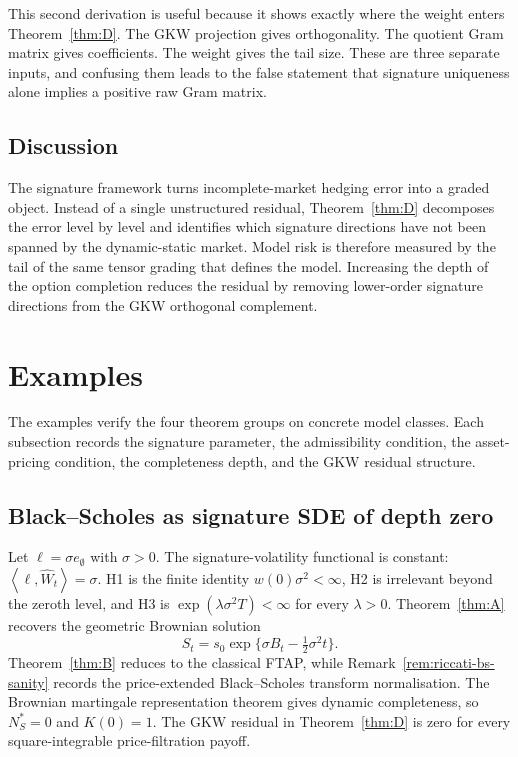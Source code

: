 \documentclass[11pt,oneside]{article}
\theoremstyle{plain}
\theoremstyle{definition}
\theoremstyle{remark}
\newcommand{\cW}{\widehat W}
\newcommand{\inner}[2]{\left\langle #1,#2\right\rangle}
\begin{document}
This second derivation is useful because it shows exactly where the weight enters Theorem~\ref{thm:D}. The GKW projection gives orthogonality. The quotient Gram matrix gives coefficients. The weight gives the tail size. These are three separate inputs, and confusing them leads to the false statement that signature uniqueness alone implies a positive raw Gram matrix.


\subsection{Discussion}

The signature framework turns incomplete-market hedging error into a graded object. Instead of a single unstructured residual, Theorem~\ref{thm:D} decomposes the error level by level and identifies which signature directions have not been spanned by the dynamic-static market. Model risk is therefore measured by the tail of the same tensor grading that defines the model. Increasing the depth of the option completion reduces the residual by removing lower-order signature directions from the GKW orthogonal complement.


\section{Examples}\label{sec:examples}

The examples verify the four theorem groups on concrete model classes. Each subsection records the signature parameter, the admissibility condition, the asset-pricing condition, the completeness depth, and the GKW residual structure.

\subsection{Black--Scholes as signature SDE of depth zero}
Let $\ell=\sigma e_\emptyset$ with $\sigma>0$. The signature-volatility functional is constant: $\inner{\ell}{\cW_t}=\sigma$. H1 is the finite identity $w(0)\sigma^2<\infty$, H2 is irrelevant beyond the zeroth level, and H3 is $\exp(\lambda\sigma^2T)<\infty$ for every $\lambda>0$. Theorem~\ref{thm:A} recovers the geometric Brownian solution
\[
S_t=s_0\exp\{\sigma B_t-\tfrac12\sigma^2t\}.
\]
Theorem~\ref{thm:B} reduces to the classical FTAP, while Remark~\ref{rem:riccati-bs-sanity} records the price-extended Black--Scholes transform normalisation. The Brownian martingale representation theorem gives dynamic completeness, so $N_S^\ast=0$ and $K(0)=1$. The GKW residual in Theorem~\ref{thm:D} is zero for every square-integrable price-filtration payoff.
\end{document}
